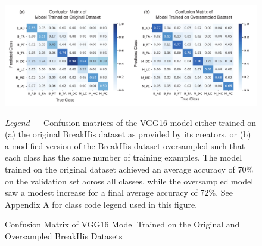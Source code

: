 \begin{figure}[p]
	\begin{center}
		\caption{Confusion Matrix of VGG16 Model Trained on the Original and Oversampled BreakHis Datasets \label{fig:confmat}}
	\end{center}
	\includegraphics[width=170mm]{figures/deepduct/confusion_matrix.pdf}
	\begin{singlespace}
		\textit{Legend} --- Confusion matrices of the VGG16 model either trained on (a) the original BreakHis dataset as provided by its creators, or (b) a modified version of the BreakHis dataset oversampled such that each class has the same number of training examples. The model trained on the original dataset achieved an average accuracy of 70\% on the validation set across all classes, while the oversampled model saw a modest increase for a final average accuracy of 72\%. See Appendix A for class code legend used in this figure.
	\end{singlespace}
	
\end{figure}

